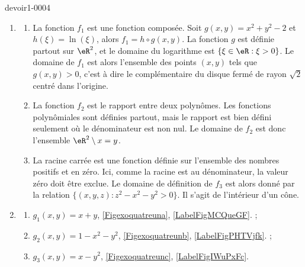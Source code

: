 \begin{corrige}{devoir1-0004}
  \begin{enumerate}
  \item 
    \begin{enumerate}
    \item  La fonction $f_1$ est une fonction composée. Soit $g(x,y)=x^2+y^2-2$ et $h(\xi)=\ln(\xi)$, alors $f_1=h\circ g (x,y)$. La fonction $g$ est définie partout sur $\eR^2$, et le domaine du logarithme est $\{\xi\in\eR : \xi>0\}$. Le domaine de $f_1$ est alors l'ensemble des points $(x,y)$ tels que $g(x,y)>0$, c'est à dire le complémentaire du disque fermé de rayon $\sqrt{2}$ centré dans l'origine. 
 
    \item  La fonction $f_2$ est le rapport entre deux polynômes. Les fonctions polynômiales sont définies partout, mais le rapport est bien défini seulement où le dénominateur est non nul. Le domaine de $f_2$ est donc l'ensemble $\eR^2\setminus {x=y}$. 

    \item  La racine carrée est une fonction définie sur l'ensemble des nombres positifs et en zéro. Ici, comme la racine est au dénominateur, la valeur zéro doit être exclue. Le domaine de définition de $f_3$ est alors donné par la relation $\{(x,y,z) : z^2-x^2-y^2 >0\}$. Il s'agit de l'intérieur d'un cône.   

    \end{enumerate}
  
  \item 

    \begin{enumerate}
    \item   $\displaystyle g_1(x,y)= x+y$, \ref{Figexoquatreuna}, \ref{LabelFigMCQueGF}. ;
    \item   $\displaystyle g_2(x,y)= 1-x^2-y^2$, \ref{Figexoquatreunb}, \ref{LabelFigPHTVjfk}. ;
    \item   $\displaystyle g_3(x,y)= x-y^2$, \ref{Figexoquatreunc}, \ref{LabelFigIWuPxFc}.
    \end{enumerate}
  \end{enumerate}



\newcommand{\CaptionFigMCQueGF}{}


\newcommand{\CaptionFigPHTVjfk}{}



\end{corrige}
